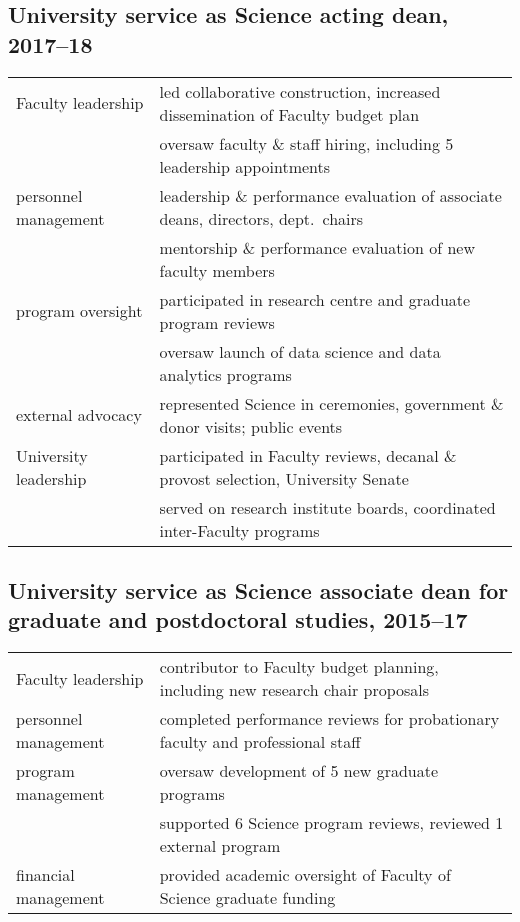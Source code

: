 \subsection{University service as Science acting dean, 2017--18}

\begin{tabularx}{\textwidth}{lX}
Faculty leadership 
& led collaborative construction, increased dissemination of Faculty budget plan\\
& oversaw faculty \& staff hiring, including 5 leadership appointments \\
personnel management & leadership \& performance evaluation of associate deans, directors, dept.\ chairs\\
&mentorship  \& performance evaluation of new faculty members\\
program oversight & participated in research centre and graduate program reviews\\ 
& oversaw launch of data science and data analytics programs\\
external advocacy & represented Science in ceremonies, government \& donor visits; public events \\
University leadership  &  participated in Faculty reviews, decanal \& provost selection, University Senate \\
 & served on research institute boards, coordinated  inter-Faculty programs\\
\end{tabularx}


\subsection{University service as Science associate dean for graduate and postdoctoral studies, 2015--17}

\begin{tabularx}{\textwidth}{lX}
Faculty leadership & contributor to Faculty  budget planning,  including new research chair proposals \\
personnel management & completed performance reviews for probationary faculty and professional staff  \\
program management  & oversaw development of 5 new graduate programs \\
& supported 6 Science program reviews, reviewed 1 external program \\
financial management & provided academic oversight of Faculty of Science graduate funding  \\

\end{tabularx}


